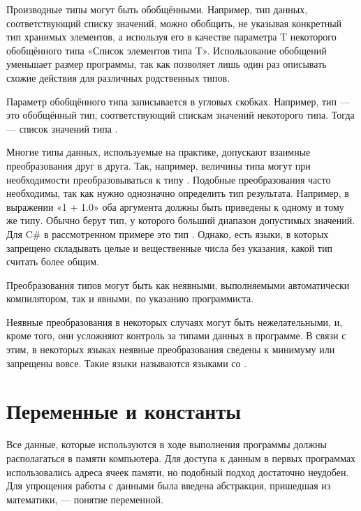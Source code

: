
Производные типы могут быть обобщёнными. Например, тип данных,
соответствующий списку значений, можно обобщить, не указывая конкретный
тип хранимых элементов, а используя его в качестве параметра T
некоторого обобщённого типа «Список элементов типа T». Использование
обобщений уменьшает размер программы, так как позволяет лишь один раз
описывать схожие действия для различных родственных типов.

Параметр обобщённого типа записывается в угловых скобках. Например,
тип  — это обобщённый тип, соответствующий спискам значений
некоторого типа. Тогда  — список значений типа
.


Многие типы данных, используемые на практике, допускают взаимные
преобразования друг в друга. Так, например, величины типа 
могут при необходимости преобразовываться к типу
. Подобные преобразования часто необходимы, так как нужно
однозначно определить тип результата. Например, в выражении «1 + 1.0»
оба аргумента должны быть приведены к одному и тому же типу. Обычно
берут тип, у которого больший диапазон допустимых значений. Для C\# в
рассмотренном примере это тип . Однако, есть языки, в
которых запрещено складывать целые и вещественные числа без указания,
какой тип считать более общим.

Преобразования типов могут быть как неявными, выполняемыми
автоматически компилятором, так и явными, по указанию программиста.

Неявные преобразования в некоторых случаях могут быть нежелательными,
и, кроме того, они усложняют контроль за типами данных в программе.  В
связи с этим, в некоторых языках неявные преобразования сведены к
минимуму или запрещены вовсе. Такие языки называются языками со
.

\section{Переменные и константы}


Все данные, которые используются в ходе выполнения программы должны
располагаться в памяти компьютера. Для доступа к данным в первых
программах использовались адреса ячеек памяти, но подобный подход
достаточно неудобен. Для упрощения работы с данными была введена
абстракция, пришедшая из математики, — понятие переменной.

